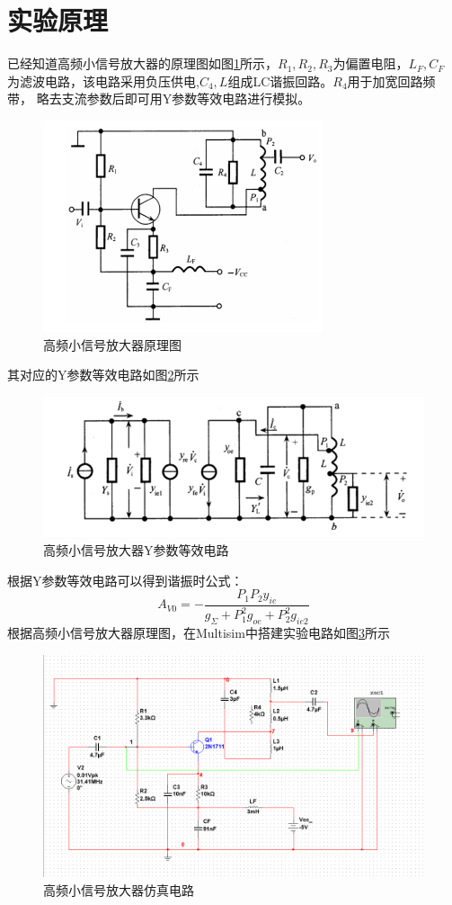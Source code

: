 \documentclass[UTF8]{ctexart}
\begin{document}
\section{实验原理}
已经知道高频小信号放大器的原理图如图\ref{img:small_signal_principle}所示，$R_1,R_2,R_3$为偏置电阻，$L_F,C_F$
为滤波电路，该电路采用负压供电,$C_4,L$组成LC谐振回路。$R_4$用于加宽回路频带，
略去支流参数后即可用Y参数等效电路进行模拟。
\begin{figure}[htbp]
    \centering
    \includegraphics[width=0.8\linewidth]{small_signal_principle.png}
    \caption{高频小信号放大器原理图}
    \label{img:small_signal_principle}
\end{figure}
其对应的Y参数等效电路如图\ref{img:small_signal_principle_Y}所示
\begin{figure}[htbp]
    \centering
    \includegraphics[width=0.8\linewidth]{small_signal_principle_Y.png}
    \caption{高频小信号放大器Y参数等效电路}
    \label{img:small_signal_principle_Y}
\end{figure}
根据Y参数等效电路可以得到谐振时公式：
$$
A_{V0}=-\frac{P_1 P_2 y_{ie}}{g_{\Sigma }+P_1^2 g_{oe}+P_2^2 g_{ie2}}
$$
根据高频小信号放大器原理图，在Multisim中搭建实验电路如图\ref{img:multisim_circuitry}所示
\begin{figure}[htbp]
    \centering
    \includegraphics[width=0.8\linewidth]{multisim_circuitry.png}
    \caption{高频小信号放大器仿真电路}
    \label{img:multisim_circuitry}
\end{figure}
\end{document}
